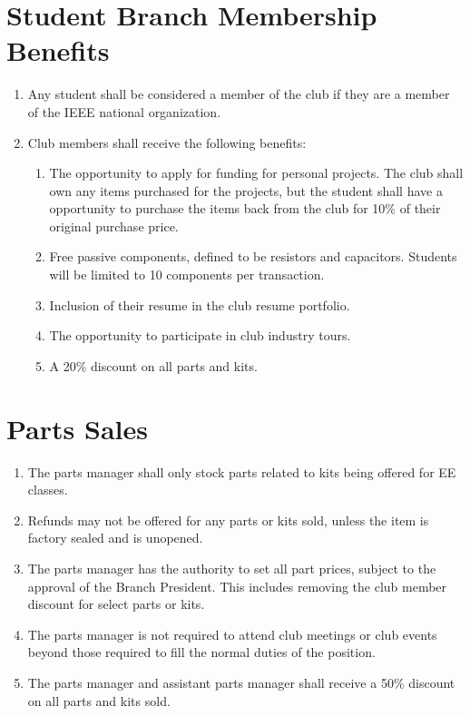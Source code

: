 \documentclass{article}
\begin{document}
\section{Student Branch Membership Benefits}
\begin{enumerate}
\item Any student shall be considered a member of the club if they are a member of the IEEE national organization.
\item Club members shall receive the following benefits:
  \begin{enumerate}
  \item The opportunity to apply for funding for personal projects. The club shall own any items purchased for the projects, but the student shall have a opportunity to purchase the items back from the club for 10\% of their original purchase price.
  \item Free passive components, defined to be resistors and capacitors. Students will be limited to 10 components per transaction.
  \item Inclusion of their resume in the club resume portfolio.
  \item The opportunity to participate in club industry tours.
  \item A 20\% discount on all parts and kits.
  \end{enumerate}
\end{enumerate}

\section{Parts Sales}
\begin{enumerate}
\item The parts manager shall only stock parts related to kits being offered for EE classes.
\item Refunds may not be offered for any parts or kits sold, unless the item is factory sealed and is unopened.
\item The parts manager has the authority to set all part prices, subject to the approval of the Branch President. This includes removing the club member discount for select parts or kits.
\item The parts manager is not required to attend club meetings or club events beyond those required to fill the normal duties of the position.
\item The parts manager and assistant parts manager shall receive a 50\% discount on all parts and kits sold.
\end{enumerate}
\end{document}
